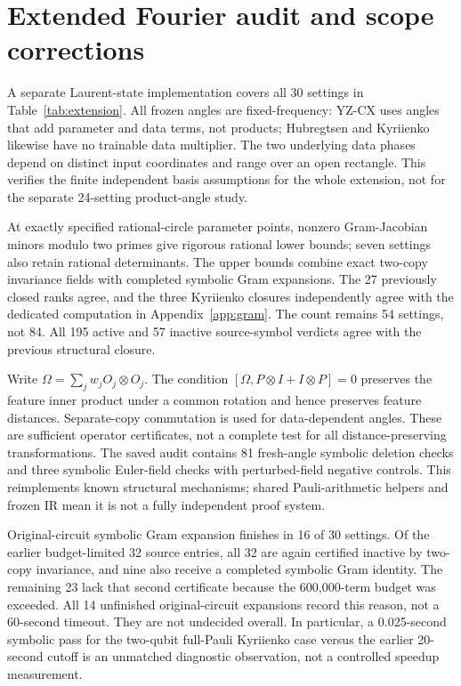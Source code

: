 \section{Extended Fourier audit and scope corrections}
\label{app:followup}
A separate Laurent-state implementation covers all 30 settings in
Table~\ref{tab:extension}. All frozen angles are fixed-frequency:
YZ-CX uses angles that add parameter and data terms, not products; Hubregtsen
and Kyriienko likewise have no trainable data multiplier. The two
underlying data phases depend on distinct input coordinates and
range over an open rectangle. This verifies the finite independent
basis assumptions for the whole extension, not for the separate
24-setting product-angle study.

At exactly specified rational-circle parameter points, nonzero
Gram-Jacobian minors modulo two primes give rigorous rational lower
bounds; seven settings also retain rational determinants. The upper
bounds combine exact two-copy invariance fields with completed
symbolic Gram expansions. The 27 previously closed ranks agree,
and the three Kyriienko closures independently agree with the
dedicated computation in Appendix~\ref{app:gram}. The count remains
54 settings, not 84. All 195 active and 57 inactive source-symbol
verdicts agree with the previous structural closure.

Write $\Omega=\sum_j w_j O_j\otimes O_j$. The condition
$[\Omega,P\otimes I+I\otimes P]=0$ preserves the feature inner
product under a common rotation and hence preserves feature
distances. Separate-copy commutation is used for data-dependent
angles. These are sufficient operator certificates, not a complete
test for all distance-preserving transformations. The saved audit
contains 81 fresh-angle symbolic deletion checks and three
symbolic Euler-field checks with perturbed-field negative controls.
This reimplements known structural mechanisms; shared Pauli-arithmetic
helpers and frozen IR mean it is not a fully independent proof system.

Original-circuit symbolic Gram expansion finishes in 16 of 30
settings. Of the earlier budget-limited 32 source entries, all 32
are again certified inactive by two-copy invariance, and nine also
receive a completed symbolic Gram identity. The remaining 23 lack
that second certificate because the 600,000-term budget was exceeded.
All 14 unfinished original-circuit expansions record this reason,
not a 60-second timeout. They are
not undecided overall. In particular, a 0.025-second symbolic pass
for the two-qubit full-Pauli Kyriienko case versus the earlier
20-second cutoff is an unmatched diagnostic observation, not a
controlled speedup measurement.

